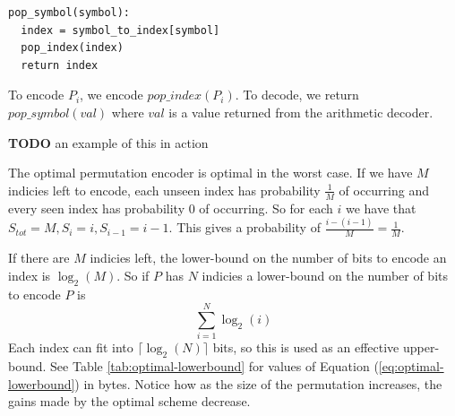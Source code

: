 \documentclass[a4paper]{report}
\newcommand{\todo}{\textbf{TODO} }
\begin{document}
\begin{verbatim}
pop_symbol(symbol):
  index = symbol_to_index[symbol]
  pop_index(index)
  return index
\end{verbatim}

To encode $P_i$, we encode $pop\_index(P_i)$. To decode, we return
$pop\_symbol(val)$ where $val$ is a value returned from the arithmetic
decoder.

\todo an example of this in action

The optimal permutation encoder is optimal in the worst case. If we have $M$
indicies left to encode, each unseen index has probability $\frac{1}{M}$ of
occurring and every seen index has probability $0$ of occurring. So for each
$i$ we have that $S_{tot}=M, S_i = i, S_{i-1} = i-1$. This gives a probability
of $\frac{i-(i-1)}{M} = \frac{1}{M}$.

If there are $M$ indicies left, the lower-bound on the number of bits to
encode an index is $\log_2(M)$. So if $P$ has $N$ indicies a lower-bound on
the number of bits to encode $P$ is
\begin{equation}
  \displaystyle\sum^{N}_{i=1} \log_2(i)
  \label{eq:optimal-lowerbound}
\end{equation}
Each index can fit into $\lceil\log_2(N)\rceil$ bits, so this is used as an
effective upper-bound. See Table \ref{tab:optimal-lowerbound} for values of
Equation (\ref{eq:optimal-lowerbound}) in bytes. Notice how as the size of the
permutation increases, the gains made by the optimal scheme decrease.


\begin{table}
  \center
  \caption{Number of bytes needed for storing permutations of different
    sizes. See Equation (\ref{eq:optimal-lowerbound}) for the lower bound. The
    effective upper-bound is
    $\lceil\log_2(N)\rceil/8$.} \label{tab:optimal-lowerbound}
\end{table}
\end{document}
